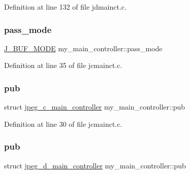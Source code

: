 Definition at line 132 of file jdmainct.\+c.

\mbox{\label{structmy__main__controller_a2de588274979de6f92951740a6e9d0ac}} 
\subsubsection{\texorpdfstring{pass\_mode}{pass\_mode}}
{\footnotesize\ttfamily \mbox{\hyperlink{jpegint_8h_a1f0803342372ac62b6903c399399c874}{J\+\_\+\+B\+U\+F\+\_\+\+M\+O\+DE}} my\+\_\+main\+\_\+controller\+::pass\+\_\+mode}



Definition at line 35 of file jcmainct.\+c.

\mbox{\label{structmy__main__controller_af6cfb28f856f55e4a715c8036f08c52f}} 
\subsubsection{\texorpdfstring{pub}{pub}\hspace{0.1cm}{\footnotesize\ttfamily [1/2]}}
{\footnotesize\ttfamily struct \mbox{\hyperlink{structjpeg__c__main__controller}{jpeg\+\_\+c\+\_\+main\+\_\+controller}} my\+\_\+main\+\_\+controller\+::pub}



Definition at line 30 of file jcmainct.\+c.

\mbox{\label{structmy__main__controller_a4880459c57978ea5fcfef2a1acbfc3fe}} 
\subsubsection{\texorpdfstring{pub}{pub}\hspace{0.1cm}{\footnotesize\ttfamily [2/2]}}
{\footnotesize\ttfamily struct \mbox{\hyperlink{structjpeg__d__main__controller}{jpeg\+\_\+d\+\_\+main\+\_\+controller}} my\+\_\+main\+\_\+controller\+::pub}



